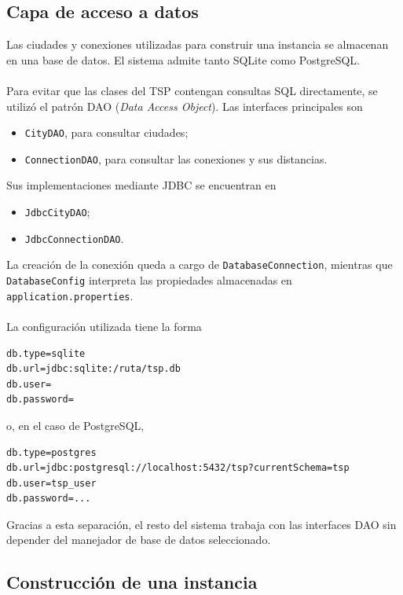 \documentclass[12pt]{article}
\begin{document}
\subsection{Capa de acceso a datos}

Las ciudades y conexiones utilizadas para construir una instancia se
almacenan en una base de datos. El sistema admite tanto SQLite como
PostgreSQL.
\\\\
Para evitar que las clases del TSP contengan consultas SQL directamente, se
utilizó el patrón DAO (\textit{Data Access Object}). Las interfaces
principales son
\begin{itemize}
    \item \texttt{CityDAO}, para consultar ciudades;
    \item \texttt{ConnectionDAO}, para consultar las conexiones y sus
    distancias.
\end{itemize}
Sus implementaciones mediante JDBC se encuentran en
\begin{itemize}
    \item \texttt{JdbcCityDAO};
    \item \texttt{JdbcConnectionDAO}.
\end{itemize}
La creación de la conexión queda a cargo de
\texttt{DatabaseConnection}, mientras que \texttt{DatabaseConfig}
interpreta las propiedades almacenadas en
\texttt{application.properties}.
\\\\
La configuración utilizada tiene la forma
\begin{verbatim}
db.type=sqlite
db.url=jdbc:sqlite:/ruta/tsp.db
db.user=
db.password=
\end{verbatim}
o, en el caso de PostgreSQL,
\begin{verbatim}
db.type=postgres
db.url=jdbc:postgresql://localhost:5432/tsp?currentSchema=tsp
db.user=tsp_user
db.password=...
\end{verbatim}
Gracias a esta separación, el resto del sistema trabaja con las interfaces
DAO sin depender del manejador de base de datos seleccionado.

\subsection{Construcción de una instancia}
\end{document}
